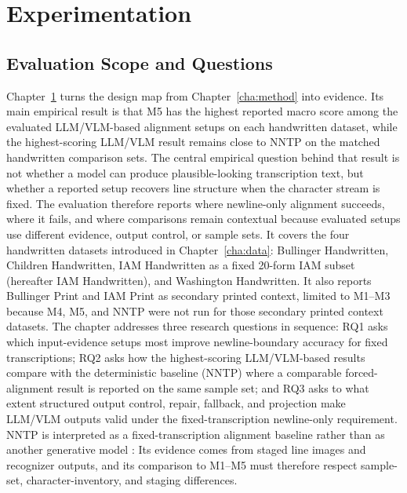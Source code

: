 
\chapter{Experimentation}
\label{cha:experimentation}

\section{Evaluation Scope and Questions}
\label{sec:experimentation_scope_role}

Chapter~\ref{cha:experimentation} turns the design map from Chapter~\ref{cha:method} into evidence. Its main empirical result is that M5 has the highest reported macro score among the evaluated LLM/VLM-based alignment setups on each handwritten dataset, while the highest-scoring LLM/VLM result remains close to NNTP on the matched handwritten comparison sets. The central empirical question behind that result is not whether a model can produce plausible-looking transcription text, but whether a reported setup recovers line structure when the character stream is fixed. The evaluation therefore reports where newline-only alignment succeeds, where it fails, and where comparisons remain contextual because evaluated setups use different evidence, output control, or sample sets. It covers the four handwritten datasets introduced in Chapter~\ref{cha:data}: Bullinger Handwritten, Children Handwritten, IAM Handwritten as a fixed 20-form IAM subset (hereafter IAM Handwritten), and Washington Handwritten. It also reports Bullinger Print and IAM Print as secondary printed context, limited to M1--M3 because M4, M5, and NNTP were not run for those secondary printed context datasets. The chapter addresses three research questions in sequence: RQ1 asks which input-evidence setups most improve newline-boundary accuracy for fixed transcriptions; RQ2 asks how the highest-scoring LLM/VLM-based results compare with the deterministic baseline (NNTP) where a comparable forced-alignment result is reported on the same sample set; and RQ3 asks to what extent structured output control, repair, fallback, and projection make LLM/VLM outputs valid under the fixed-transcription newline-only requirement. NNTP is interpreted as a fixed-transcription alignment baseline rather than as another generative model : Its evidence comes from staged line images and recognizer outputs, and its comparison to M1--M5 must therefore respect sample-set, character-inventory, and staging differences.


